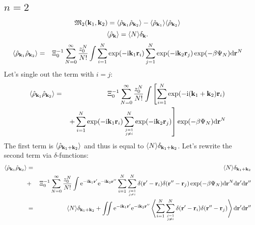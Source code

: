 \subsection{$n=2$}
\begin{equation}
	\mathfrak{M}_2(\vb k_1, \vb k_2)
	= \langle \hat{\rho}_{\vb k_1} \hat{\rho}_{\vb k_2} \rangle - \langle \hat{\rho}_{\vb k_1} \rangle \langle\hat{\rho}_{\vb k_2} \rangle
\end{equation}
\begin{equation}
	\langle \hat{\rho}_{\vb k} \rangle = \langle N\rangle \delta_{\vb k}.
\end{equation}
\begin{eqnarray}
	\langle \hat{\rho}_{\vb k_1} \hat{\rho}_{\vb k_2} \rangle &=& \Xi_0^{-1} \sum_{N=0}^{\infty} \frac{z_0^N}{N!} \int 
	\sum_{i=1}^N \exp(-{\rm i}\vb k_1\vb r_i) \sum_{j=1}^N \exp(-{\rm i}\vb k_2\vb r_j) \exp(-\beta\Psi_N) {\rm d} {\vb r}^N
\end{eqnarray}
Let's single out the term with $i=j$:
\begin{eqnarray}
	\langle \hat{\rho}_{\vb k_1} \hat{\rho}_{\vb k_2} \rangle &=& 
	\Xi_0^{-1} \sum_{N=0}^{\infty} \frac{z_0^N}{N!} \int 
	\left[
	\sum_{i=1}^N \exp(-{\rm i}(\vb k_1 +  \vb k_2)\vb r_i)
	\right. \nonumber\\
	&& \left. + \sum_{i=1}^N \exp(-{\rm i}\vb k_1\vb r_i) \sum_{j=1 \atop j\neq i}^N \exp(-{\rm i}\vb k_2\vb r_j) 
	\right]\exp(-\beta\Psi_N) {\rm d} {\vb r}^N
\end{eqnarray}
The first term is $\langle\hat{\rho}_{\vb k_1 + \vb k_2} \rangle$ and thus is equal to $\langle N \rangle\delta_{\vb k_1 + \vb k_2}$.
Let's rewrite the second term via $\delta$-functions:
\begin{eqnarray}
	\langle \hat{\rho}_{\vb k_1} \hat{\rho}_{\vb k_2} \rangle &=& \langle N \rangle\delta_{\vb k_1 + \vb k_2}
	\nonumber\\
	&+& \Xi_0^{-1} \sum_{N=0}^{\infty} \frac{z_0^N}{N!} \int 
	{\rm e}^{-{\rm i}\vb k_1\vb r'} {\rm e}^{-{\rm i}\vb k_2\vb r''} 
	\sum_{i=1}^N  \sum_{j=1 \atop j\neq i}^N \delta(\vb r'- \vb r_i) \delta(\vb r'' - \vb r_j)
	\exp(-\beta\Psi_N) {\rm d} {\vb r}^N {\rm d} {\vb r'} {\rm d} {\vb r''}
	\nonumber\\
	&=& 
	\langle N \rangle\delta_{\vb k_1 + \vb k_2} + \iint {\rm e}^{-{\rm i}\vb k_1\vb r'} {\rm e}^{-{\rm i}\vb k_2\vb r''}  
	\left\langle \sum_{i=1}^N  \sum_{j=1 \atop j\neq i}^N \delta(\vb r'- \vb r_i) \delta(\vb r'' - \vb r_j) \right\rangle {\rm d} {\vb r'} {\rm d} {\vb r''}
\end{eqnarray}
